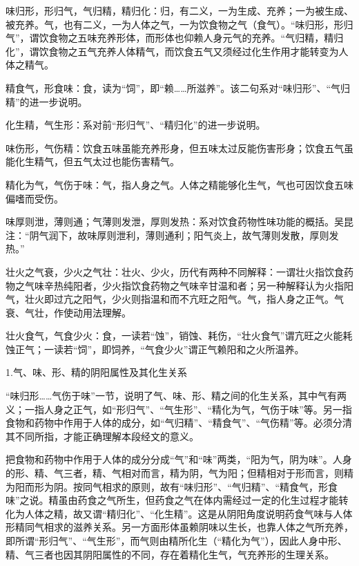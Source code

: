 \documentclass[12pt]{ctexbook}
\begin{document}
\begin{jiaozhu}
	\item 味归形，形归气，气归精，精归化：归，有二义，一为生成、充养；一为被生成、被充养。气，也有二义，一为人体之气，一为饮食物之气（食气）。“味归形，形归气”，谓饮食物之五味充养形体，而形体也仰赖人身元气的充养。“气归精，精归化”，谓饮食物之五气充养人体精气，而饮食五气又须经过化生作用才能转变为人体之精气。
	\item 精食气，形食味：食，读为“饲”，即“赖……所滋养”。该二句系对“味归形”、“气归精”的进一步说明。
	\item 化生精，气生形：系对前“形归气”、“精归化”的进一步说明。
	\item 味伤形，气伤精：饮食五味虽能充养形身，但五味太过反能伤害形身；饮食五气虽能化生精气，但五气太过也能伤害精气。
	\item 精化为气，气伤于味：气，指人身之气。人体之精能够化生气，气也可因饮食五味偏嗜而受伤。
	\item 味厚则泄，薄则通；气薄则发泄，厚则发热：系对饮食药物性味功能的概括。吴昆注：“阴气润下，故味厚则泄利，薄则通利；阳气炎上，故气薄则发散，厚则发热。”
	\item 壮火之气衰，少火之气壮：壮火、少火，历代有两种不同解释：一谓壮火指饮食药物之气味辛热纯阳者，少火指饮食药物之气味辛甘温和者；另一种解释认为火指阳气，壮火即过亢之阳气，少火则指温和而不亢旺之阳气。气，指人身之正气。气衰、气壮，作使动用法理解。
	\item 壮火食气，气食少火：食，一读若“蚀”，销蚀、耗伤，“壮火食气”谓亢旺之火能耗蚀正气；一读若“饲”，即饲养，“气食少火”谓正气赖阳和之火所温养。
\end{jiaozhu}



1.气、味、形、精的阴阳属性及其化生关系

“味归形……气伤于味”一节，说明了气、味、形、精之间的化生关系，其中气有两义；一指人身之正气，如“形归气”、“气生形”、“精化为气，气伤于味”等。另一指食物和药物中作用于人体的成分，如“气归精”、“精食气”、“气伤精”等。必须分清其不同所指，才能正确理解本段经文的意义。

把食物和药物中作用于人体的成分分成“气”和“味”两类，“阳为气，阴为味”。人身的形、精、气三者，精、气相对而言，精为阴，气为阳；但精相对于形而言，则精为阳而形为阴。按同气相求的原则，故有“味归形”、“气归精”、“精食气，形食味”之说。精虽由药食之气所生，但药食之气在体内需经过一定的化生过程才能转化为人体之精，故又谓“精归化”、“化生精”。这是从阴阳角度说明药食气味与人体形精同气相求的滋养关系。另一方面形体虽赖阴味以生长，也靠人体之气所充养，即所谓“形归气”、“气生形”，而气则由精所化生（“精化为气”），因此人身中形、精、气三者也因其阴阳属性的不同，存在着精化生气，气充养形的生理关系。
\end{document}
